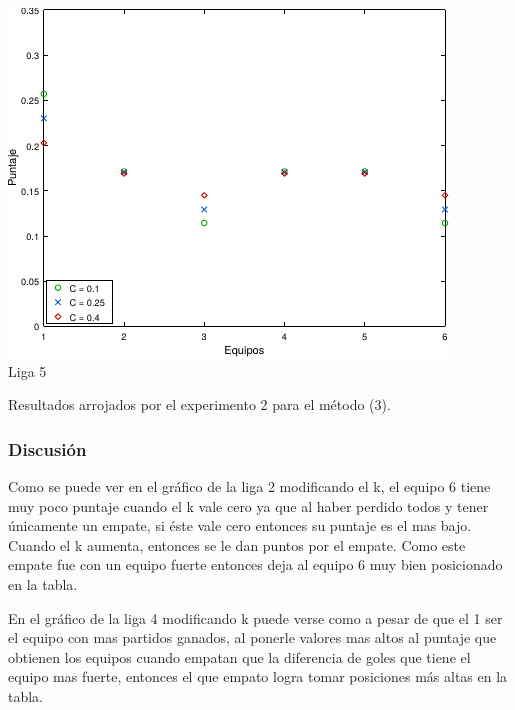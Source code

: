             \noindent{} \begin{minipage}{\textwidth}
                \begin{center}
                    \includegraphics{graficos/exp3-partidos-liga5-C} \\
                    {\small Liga 5}

                    \vspace{1em}

                    Resultados arrojados por el experimento 2 para el método (3).

                    \vspace{1em}
                \end{center}
            \end{minipage}
        

            \subsubsection*{Discusión}
            Como se puede ver en el gráfico de la liga 2 modificando el k, el equipo 6 tiene muy poco puntaje cuando el k vale cero ya que al haber perdido todos y tener únicamente un empate, si éste vale cero entonces su puntaje es el mas bajo. Cuando el k aumenta, entonces se le dan puntos por el empate. Como este empate fue con un equipo fuerte entonces deja al equipo 6 muy bien posicionado en la tabla.

            En el gráfico de la liga 4 modificando k puede verse como a pesar de que el 1 ser el equipo con mas partidos ganados, al ponerle valores mas altos al puntaje que obtienen los equipos cuando empatan que la diferencia de goles que tiene el equipo mas fuerte, entonces el que empato logra tomar posiciones más altas en la tabla.

